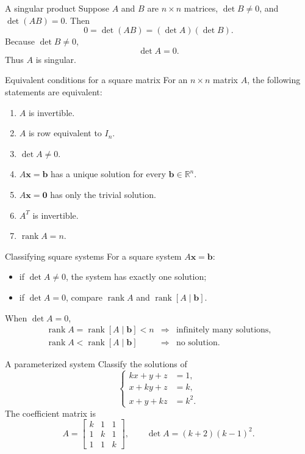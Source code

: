 \documentclass[aspectratio=169]{beamer}
\newcommand{\R}{\mathbb{R}}
\newcommand{\vect}[1]{\mathbf{#1}}
\newcommand{\rank}{\operatorname{rank}}
\begin{document}
\begin{frame}{A singular product}
Suppose $A$ and $B$ are $n\times n$ matrices, $\det B\ne0$, and $\det(AB)=0$.
Then
\[
0=\det(AB)=(\det A)(\det B).
\]
Because $\det B\ne0$,
\[
\boxed{\det A=0}.
\]
Thus $A$ is singular.
\end{frame}

\begin{frame}[shrink=4]{Equivalent conditions for a square matrix}
For an $n\times n$ matrix $A$, the following statements are equivalent:
\begin{enumerate}
  \item $A$ is invertible.
  \item $A$ is row equivalent to $I_n$.
  \item $\det A\ne0$.
  \item $A\vect x=\vect b$ has a unique solution for every $\vect b\in\R^n$.
  \item $A\vect x=\vect0$ has only the trivial solution.
  \item $A^T$ is invertible.
  \item $\rank A=n$.
\end{enumerate}
\end{frame}

\begin{frame}{Classifying square systems}
For a square system $A\vect x=\vect b$:
\begin{itemize}
  \item if $\det A\ne0$, the system has exactly one solution;
  \item if $\det A=0$, compare $\rank A$ and $\rank[A\mid\vect b]$.
\end{itemize}
\pause
When $\det A=0$,
\[
\begin{array}{ccl}
\rank A=\rank[A\mid\vect b]<n &\Longrightarrow& \text{infinitely many solutions},\\[1ex]
\rank A<\rank[A\mid\vect b] &\Longrightarrow& \text{no solution}.
\end{array}
\]
\end{frame}

\begin{frame}{A parameterized system}
Classify the solutions of
\[
\left\{\begin{aligned}
kx+y+z&=1,\\
x+ky+z&=k,\\
x+y+kz&=k^2.
\end{aligned}\right.
\]
The coefficient matrix is
\[
A=\begin{bmatrix}k&1&1\\1&k&1\\1&1&k\end{bmatrix},
\qquad
\det A=(k+2)(k-1)^2.
\]
\end{frame}
\end{document}
